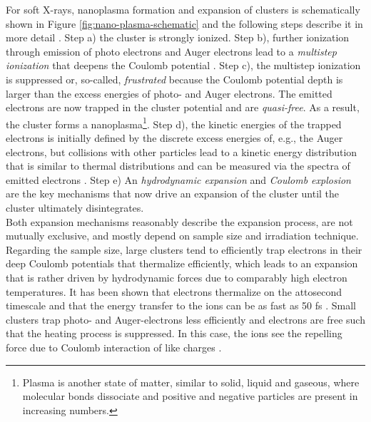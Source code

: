 For soft X-rays, nanoplasma formation and expansion of clusters is schematically shown in Figure \ref{fig:nano-plasma-schematic} and the following steps describe it in more detail \citep{Arbeiter-2011-NJP,Bostedt-2010-JPB}. Step a) the cluster is strongly ionized. Step b), further ionization through emission of photo electrons and Auger electrons lead to a \textit{multistep ionization} that deepens the Coulomb potential \citep{Wabnitz-2002-Nature,Laarmann-2004-PRL,Bostedt-2008-PRL}. Step c), the multistep ionization is suppressed or, so-called, \textit{frustrated} because the Coulomb potential depth is larger than the excess energies of photo- and Auger electrons. The emitted electrons are now trapped in the cluster potential and are \textit{quasi-free}. As a result, the cluster forms a nanoplasma\footnote{Plasma is another state of matter, similar to solid, liquid and gaseous, where molecular bonds dissociate and positive and negative particles are present in increasing numbers.}. Step d), the kinetic energies of the trapped electrons is initially defined by the discrete excess energies of, e.g., the Auger electrons, but collisions with other particles lead to a kinetic energy distribution that is similar to thermal distributions and can be measured via the spectra of emitted electrons \citep{Laarmann-2005-PRL,Bostedt-2010-NJP}. Step e) An \textit{hydrodynamic expansion} and \textit{Coulomb explosion} are the key mechanisms that now drive an expansion of the cluster until the cluster ultimately disintegrates.\\[1\baselineskip]
%
Both expansion mechanisms reasonably describe the expansion process, are not mutually exclusive, and mostly depend on sample size and irradiation technique. Regarding the sample size, large clusters tend to efficiently trap electrons in their deep Coulomb potentials that thermalize efficiently, which leads to an expansion that is rather driven by hydrodynamic forces due to comparably high electron temperatures. It has been shown that electrons thermalize on the attosecond timescale and that the energy transfer to the ions can be as fast as 50 fs \citep{Arbeiter-2010-PRA}. Small clusters trap photo- and Auger-electrons less efficiently and electrons are free such that the heating process is suppressed. In this case, the ions see the repelling force due to Coulomb interaction of like charges \citep{Lezius-1998-PRL}.\\[1\baselineskip]
%
